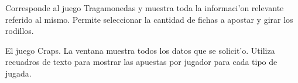 Corresponde al juego Tragamonedas y muestra toda la informaci'on relevante referido al mismo. Permite seleccionar la cantidad de fichas a apostar y girar los rodillos.
\clearpage

El juego Craps. La ventana muestra todos los datos que se solicit'o. Utiliza recuadros de texto para mostrar las apuestas por jugador para cada tipo de jugada.
\clearpage
